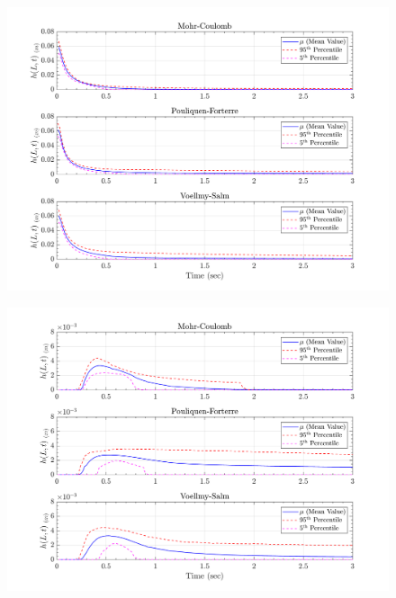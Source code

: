 \documentclass{article}
\begin{document}
\begin{figure}[H]
	\begin{minipage}[b]{0.5\linewidth}
    	\centering
    	\includegraphics[width=1\textwidth]{InclinedPlane/LocalRecords/Records/H_L1.png}
    	\label{fig:Ramp-L1-H}
	\end{minipage}
	\begin{minipage}[b]{0.5\linewidth}
		\centering
		\includegraphics[width=1\textwidth]{InclinedPlane/LocalRecords/Records/H_L8.png}
    	\label{fig:Ramp-L2-H}
    \end{minipage}


\end{figure}
\end{document}
